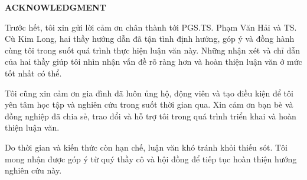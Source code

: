 \documentclass[../main.tex]{subfiles}
\begin{document}
\begin{center}
    \Large{\textbf{ACKNOWLEDGMENT}}\\
\end{center}
\vspace{1cm}
Trước hết, tôi xin gửi lời cảm ơn chân thành tới PGS.TS. Phạm Văn Hải và TS. Cù Kim Long, hai thầy hướng dẫn đã tận tình định hướng, góp ý và đồng hành cùng tôi trong suốt quá trình thực hiện luận văn này. Những nhận xét và chỉ dẫn của hai thầy giúp tôi nhìn nhận vấn đề rõ ràng hơn và hoàn thiện luận văn ở mức tốt nhất có thể.

Tôi cũng xin cảm ơn gia đình đã luôn ủng hộ, động viên và tạo điều kiện để tôi yên tâm học tập và nghiên cứu trong suốt thời gian qua. Xin cảm ơn bạn bè và đồng nghiệp đã chia sẻ, trao đổi và hỗ trợ tôi trong quá trình triển khai và hoàn thiện luận văn.

Do thời gian và kiến thức còn hạn chế, luận văn khó tránh khỏi thiếu sót. Tôi mong nhận được góp ý từ quý thầy cô và hội đồng để tiếp tục hoàn thiện hướng nghiên cứu này.
\end{document}
